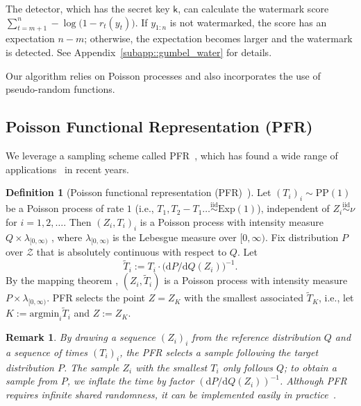 \documentclass{article}
\theoremstyle{plain}
\newtheorem{remark}[theorem]{Remark}
\theoremstyle{definition}
\newtheorem{definition}[theorem]{Definition}
\begin{document}
The detector, which has the secret key $\mathsf{k}$, can calculate the watermark score $ \sum^n_{t = m + 1}-\log\big(1 - r_t(y_t) \big)$. 
If $y_{1:n}$ is not watermarked, the score has an expectation $n - m$; otherwise, the expectation becomes larger and the watermark is detected. 
See Appendix~\ref{subapp::gumbel_water} for details. %

Our algorithm relies on Poisson processes and also incorporates the use of pseudo-random functions. 


\subsection{Poisson Functional Representation (PFR)}
\label{subsec::PFR}


We leverage a sampling scheme called PFR~\citep{li2018strong, maddison2014sampling}, which 
has found a wide range of applications~\citep{li2021unified, theis2022algorithms, liu2024universal, hentila2024communication, yang2023introduction, song2025downlink, zamani2023privacy, theis2022lossy, zhou2026dual} in recent years.
\begin{definition}[Poisson functional representation (PFR)~\citep{li2018strong, maddison2014sampling}] \label{def::PFR}
Let $(T_{i})_{i}\sim \mathrm{PP}(1)$ be a Poisson process of rate $1$ (i.e., $T_{1},T_{2}-T_{1}\ldots \stackrel{\mathrm{iid}}{\sim} \mathrm{Exp}(1)$),
independent of $Z_{i}\stackrel{\mathrm{iid}}{\sim} \nu$ for $i=1,2,\ldots$. 
Then $(Z_{i},T_{i})_{i}$
is a Poisson process with intensity measure $Q\times\lambda_{[0,\infty)}$ \citep{last2017lectures}, where $\lambda_{[0,\infty)}$ is the Lebesgue measure over $[0,\infty)$.
Fix distribution $P$ over $\mathcal{Z}$ that is absolutely continuous with respect to $Q$. Let 
\begin{equation}
    \tilde{T}_{i}:=T_{i} \cdot \big({\mathrm{d}P}/{\mathrm{d}Q}(Z_{i})\big)^{-1}.
    \label{eq:PFR}
\end{equation}
By the mapping theorem \citep{last2017lectures}, $(Z_{i},\tilde{T}_{i})$ is a Poisson process with intensity measure $P\times\lambda_{[0,\infty)}$. 
PFR selects the point $Z=Z_{K}$ with the smallest associated $\tilde{T}_{K}$, 
i.e., let $K:=\mathrm{argmin}_{i}\tilde{T}_{i}$ and $Z := Z_K$.
\end{definition}
\begin{remark}
    By drawing a sequence $(Z_i)_i$ from the \emph{reference} distribution $Q$ and a sequence of \emph{times} $(T_i)_i$, the PFR selects a sample following the \emph{target} distribution $P$. 
    The sample $Z_i$ with the smallest $T_i$ only follows $Q$; to obtain a sample from $P$, we inflate the time by factor $({\mathrm{d}P}/{\mathrm{d}Q}(Z_{i}))^{-1}$. 
    Although PFR requires infinite shared randomness, it can be implemented easily in practice~\citep{theis2022algorithms}. 
\end{remark}
\end{document}
